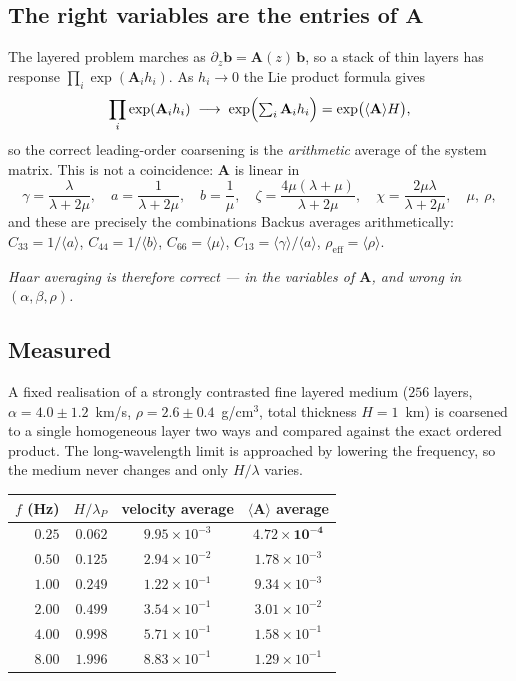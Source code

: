 \documentclass[11pt,a4paper]{article}
\newcommand{\bA}{\mathbf{A}}
\newcommand{\bb}{\mathbf{b}}
\newcommand{\avg}[1]{\langle #1 \rangle}
\begin{document}
\subsection{The right variables are the entries of $\bA$}

The layered problem marches as $\partial_z \bb = \bA(z)\,\bb$, so a stack of
thin layers has response $\prod_i \exp(\bA_i h_i)$.  As $h_i \to 0$ the Lie
product formula gives
\begin{equation}\label{eq:lie}
  \prod_i \exp(\bA_i h_i) \;\longrightarrow\;
  \exp\Bigl(\textstyle\sum_i \bA_i h_i\Bigr) = \exp\bigl(\avg{\bA} H\bigr),
\end{equation}
so the correct leading-order coarsening is the \emph{arithmetic} average of the
system matrix.  This is not a coincidence: $\bA$ is linear in
\[
  \gamma = \frac{\lambda}{\lambda+2\mu},\quad
  a = \frac{1}{\lambda+2\mu},\quad
  b = \frac{1}{\mu},\quad
  \zeta = \frac{4\mu(\lambda+\mu)}{\lambda+2\mu},\quad
  \chi = \frac{2\mu\lambda}{\lambda+2\mu},\quad \mu,\ \rho,
\]
and these are precisely the combinations Backus averages arithmetically:
$C_{33} = 1/\avg{a}$, $C_{44} = 1/\avg{b}$, $C_{66} = \avg{\mu}$,
$C_{13} = \avg{\gamma}/\avg{a}$, $\rho_{\text{eff}} = \avg{\rho}$.

\emph{Haar averaging is therefore correct --- in the variables of $\bA$, and
wrong in $(\alpha,\beta,\rho)$.}

\subsection{Measured}

A fixed realisation of a strongly contrasted fine layered medium ($256$ layers,
$\alpha = 4.0\pm1.2$~km/s, $\rho = 2.6\pm0.4$~g/cm$^3$, total thickness
$H = 1$~km) is coarsened to a single homogeneous layer two ways and compared
against the exact ordered product.  The long-wavelength limit is approached by
lowering the frequency, so the medium never changes and only $H/\lambda$ varies.

\begin{center}
\begin{tabular}{rrcc}
\toprule
$f$ (Hz) & $H/\lambda_P$ & velocity average & $\avg{\bA}$ average \\
\midrule
$0.25$ & $0.062$ & $9.95\times10^{-3}$ & $\mathbf{4.72\times10^{-4}}$ \\
$0.50$ & $0.125$ & $2.94\times10^{-2}$ & $1.78\times10^{-3}$ \\
$1.00$ & $0.249$ & $1.22\times10^{-1}$ & $9.34\times10^{-3}$ \\
$2.00$ & $0.499$ & $3.54\times10^{-1}$ & $3.01\times10^{-2}$ \\
$4.00$ & $0.998$ & $5.71\times10^{-1}$ & $1.58\times10^{-1}$ \\
$8.00$ & $1.996$ & $8.83\times10^{-1}$ & $1.29\times10^{-1}$ \\
\bottomrule
\end{tabular}
\end{center}
\end{document}
